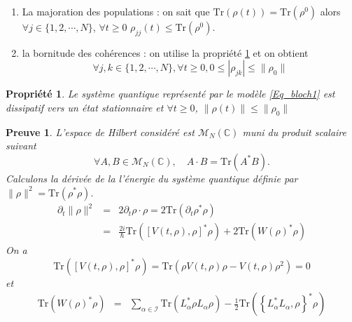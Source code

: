 \documentclass[a4paper]{article}
\newtheorem{property}{Propriété}[section]
\newtheorem*{preuve}{\textbf{Preuve}}
\newcommand{\dt}{\partial_{t}}
\newcommand{\Tr}{{\mathrm{Tr}}}
\begin{document}
\begin{itemize}
\begin{enumerate}
$$\dt \rho(t) =-\frac{i}{\hbar}\left[ V(t,\rho),\rho\right] + \sum_{\alpha \in \mathcal{I}} \left( L_{\alpha}\rho L_{\alpha}^* -\frac12\left\{ L_{\alpha}^* L_{\alpha}, \rho \right\}\right)$$
où $ \mathcal{I}=\left\{ (n,m) \in \mathbb{N}^2; n<m<N\right\}$,
$$ L_{\alpha} =\sum_{j=1}^{N} \sum_{k=1}^{N} \alpha_{jk} M_{jk}, \quad \text{avec}  \quad 
(M_{jk} )_{l,m}=\left\{
\begin{array}{rcl}
1  & \text{si} & (l,m)=(j,k) \\
0 & sinon
\end{array}
\right.$$
Calculons 
$$\dt \rho^*(t) =-\frac{i}{\hbar}\left[ V(t,\rho^*),\rho^*\right] + \sum_{\alpha \in \mathcal{I}} \left( L_{\alpha}\rho L_{\alpha}^* -\frac12\left\{ L_{\alpha}^* L_{\alpha}, \rho^* \right\}\right).$$
Sachant que l'unicité de la solution est vérifiée alors $\forall t \geq 0$, $\rho^*(t) =\rho^(t)$.
\item La majoration des populations : on sait que $\Tr(\rho(t)) = \Tr(\rho^0)$ alors $\forall j \in \{1,2,\cdots,N\}$, $\forall t \geq 0$ $\rho_{jj}(t) \leq \Tr(\rho^0)$.
\item la bornitude des cohérences : on utilise la propriété \ref{prop1} et on obtient 
$$\forall j, k \in \{1,2,\cdots,N\}, \forall t \geq 0, 0\leq  |\rho_{jk}| \leq \|\rho_0\|$$ 
\end{enumerate}
\begin{property}
Le système quantique représenté par le modèle \eqref{Eq_bloch1} est dissipatif vers un état stationnaire et $\forall t \geq 0$, $\|\rho(t)\|\leq \|\rho_0\|$
\label{prop1}
\end{property}
\begin{preuve}
L'espace de Hilbert considéré est $\mathcal{M}_N(\mathbb{C})$ muni du produit scalaire suivant 
$$\forall A, B \in \mathcal{M}_N(\mathbb{C}), \quad A\cdot B = \Tr(A^* B).$$
Calculons la dérivée de la l'énergie du système quantique définie par  $\|\rho\|^2=\Tr(\rho^* \rho)$.
\begin{eqnarray*}
\dt \|\rho\|^2 &=& 2 \dt \rho \cdot \rho=2\Tr\left( \dt \rho^* \rho\right)\\
                  &=& \frac{2i}{\hbar}\Tr\left( \left[ V(t,\rho),\rho\right]^* \rho\right) + 2\Tr\left(  W(\rho)^*\rho\right)
\end{eqnarray*}
On a $$\Tr\left( \left[ V(t,\rho),\rho\right]^* \rho\right)=\Tr\left(\rho V(t,\rho)\rho-V(t,\rho)\rho^2\right)=0$$
et 
\begin{eqnarray*}
\Tr\left(  W(\rho)^*\rho\right) &=& \sum_{\alpha \in \mathcal{I}} \Tr\left(   L_{\alpha}^*\rho L_{\alpha}\rho\right) -\frac12\Tr\left(\left\{ L_{\alpha}^* L_{\alpha}, \rho \right\}^* \rho\right)  \\

\end{eqnarray*}
\end{preuve}
\end{itemize}
\end{document}
